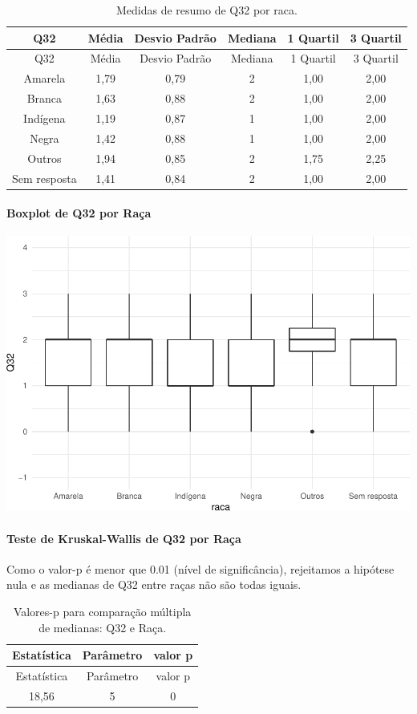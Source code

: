 \documentclass[]{article}
\let\oldparagraph\paragraph
\renewcommand{\paragraph}[1]{\oldparagraph{#1}\mbox{}}
\begin{document}
\begin{longtable}[]{@{}cccccc@{}}
\caption{\label{tab:unnamed-chunk-1109}Medidas de resumo de Q32 por raca.}\tabularnewline
\toprule
Q32 & Média & Desvio Padrão & Mediana & 1 Quartil & 3 Quartil\tabularnewline
\midrule
\endfirsthead
\toprule
Q32 & Média & Desvio Padrão & Mediana & 1 Quartil & 3 Quartil\tabularnewline
\midrule
\endhead
Amarela & 1,79 & 0,79 & 2 & 1,00 & 2,00\tabularnewline
Branca & 1,63 & 0,88 & 2 & 1,00 & 2,00\tabularnewline
Indígena & 1,19 & 0,87 & 1 & 1,00 & 2,00\tabularnewline
Negra & 1,42 & 0,88 & 1 & 1,00 & 2,00\tabularnewline
Outros & 1,94 & 0,85 & 2 & 1,75 & 2,25\tabularnewline
Sem resposta & 1,41 & 0,84 & 2 & 1,00 & 2,00\tabularnewline
\bottomrule
\end{longtable}

\hypertarget{boxplot-de-q32-por-rauxe7a}{%
\paragraph{Boxplot de Q32 por Raça}\label{boxplot-de-q32-por-rauxe7a}}

\begin{center}\includegraphics[width=0.75\linewidth]{relatorio_covid19_files/figure-latex/unnamed-chunk-1110-1} \end{center}

\hypertarget{teste-de-kruskal-wallis-de-q32-por-rauxe7a}{%
\paragraph{Teste de Kruskal-Wallis de Q32 por Raça}\label{teste-de-kruskal-wallis-de-q32-por-rauxe7a}}

Como o valor-p é menor que 0.01 (nível de significância), rejeitamos a hipótese nula e as medianas de Q32 entre raças não são todas iguais.

\begin{longtable}[]{@{}ccc@{}}
\caption{\label{tab:unnamed-chunk-1112}Valores-p para comparação múltipla de medianas: Q32 e Raça.}\tabularnewline
\toprule
Estatística & Parâmetro & valor p\tabularnewline
\midrule
\endfirsthead
\toprule
Estatística & Parâmetro & valor p\tabularnewline
\midrule
\endhead
18,56 & 5 & 0\tabularnewline
\bottomrule
\end{longtable}
\end{document}
